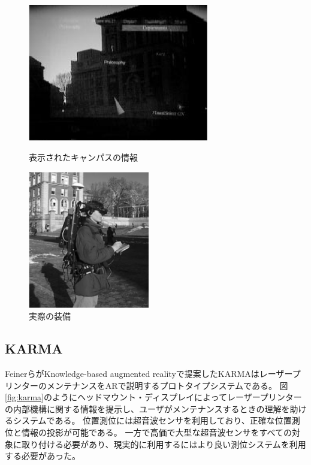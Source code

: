 \begin{figure}[h]
  \begin{minipage}{0.5\hsize}
    \centering 
    \includegraphics[height=60mm]{images/a_touring_machine_ar.png}
    \caption{表示されたキャンパスの情報} \label{fig:a_touring_machine_ar}
  \end{minipage}
  \begin{minipage}{0.5\hsize}
    \centering 
    \includegraphics[height=60mm]{images/a_touring_machine_pc.png}
    \caption{実際の装備} \label{fig:a_touring_machine_pc}
  \end{minipage}
\end{figure}


\subsection{KARMA}
FeinerらがKnowledge-based augmented reality\cite{10.1145/159544.159587}で提案したKARMAはレーザープリンターのメンテナンスをARで説明するプロトタイプシステムである。
図\ref{fig:karma}のようにヘッドマウント・ディスプレイによってレーザープリンターの内部機構に関する情報を提示し、ユーザがメンテナンスするときの理解を助けるシステムである。
位置測位には超音波センサを利用しており、正確な位置測位と情報の投影が可能である。
一方で高価で大型な超音波センサをすべての対象に取り付ける必要があり、現実的に利用するにはより良い測位システムを利用する必要があった。

